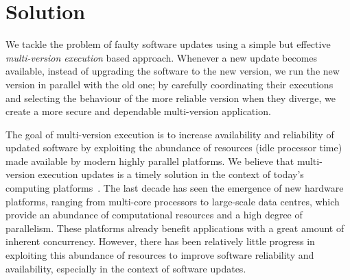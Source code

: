 \section{Solution}
\label{overview:solution}

We tackle the problem of faulty software updates using a simple but effective
\emph{multi-version execution} based approach. Whenever a new update becomes
available, instead of upgrading the software to the new version, we run the new
version in parallel with the old one; by carefully coordinating their
executions and selecting the behaviour of the more reliable version when they
diverge, we create a more secure and dependable multi-version application.


The goal of multi-version execution is to increase availability and reliability
of updated software by exploiting the abundance of resources (\eg idle
processor time) made available by modern highly parallel platforms.  We believe
that multi-version execution updates is a timely solution in the context of
today's computing platforms~\cite{multiplicity}. The last decade has seen the
emergence of new hardware platforms, ranging from multi-core processors to
large-scale data centres, which provide an abundance of computational resources
and a high degree of parallelism. These platforms already benefit applications
with a great amount of inherent concurrency.  However, there has been
relatively little progress in exploiting this abundance of resources to improve
software reliability and availability, especially in the context of software
updates.

